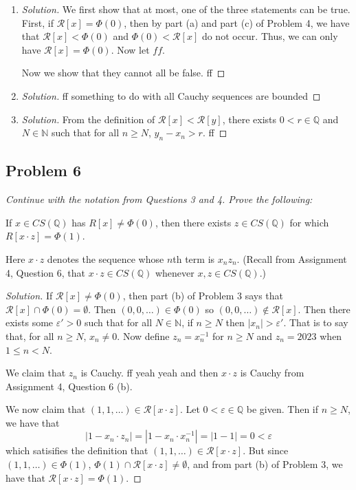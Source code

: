 \documentclass{article}
\newcommand{\N}{{\mathbb N}}
\newcommand{\Q}{{\mathbb Q}}
\newcommand{\ep}{{\varepsilon}}
\newcommand{\SR}{{\mathcal R}}
\begin{document}
\begin{enumerate}
	\item \begin{proof}[Solution]\let\qed\relax
		We first show that at most,
		one of the three statements can be true.
		First, if $\SR[x] = \Phi(0)$,
		then by part (a) and part (c) of Problem 4,
		we have that $\SR[x] < \Phi(0)$ and $\Phi(0) < \SR[x]$
		do not occur.
		Thus, we can only have $\SR[x] = \Phi(0)$.
		Now let $ff$.

		Now we show that they cannot all be false. ff
	\end{proof}
	\item \begin{proof}[Solution]\let\qed\relax
		ff something to do with all Cauchy sequences are bounded
	\end{proof}
	\item \begin{proof}[Solution]\let\qed\relax
		From the definition of $\SR[x] < \SR[y]$,
		there exists $0 < r \in \Q$ and $N \in \N$
		such that for all $n \geq N$,
		$y_n - x_n > r$.
		ff
	\end{proof} 
\end{enumerate}
\clearpage

\subsection*{Problem 6}
{\it Continue with the notation from Questions 3 and 4. Prove the following:
\begin{center}
	If $x \in CS(\Q)$ has $R[x] \neq \Phi(0)$,
	then there exists $z \in CS(\Q)$ for which $R[x\cdot z] = \Phi(1)$.
\end{center}
Here $x \cdot z$ denotes the sequence whose $n$th term is $x_nz_n$.
(Recall from Assignment 4, Question 6,
that $x\cdot z \in CS(\Q)$ whenever $x,z \in CS(\Q)$.)}

\begin{proof}[Solution]\let\qed\relax
	If $\SR[x] \neq \Phi(0)$,
	then part (b) of Problem 3 says that $\SR[x] \cap \Phi(0) = \emptyset$.
	Then $(0,0,\dots) \in \Phi(0)$ so $(0,0,\dots) \not\in \SR[x]$.
	Then there exists some $\ep' > 0$ such that for all
	$N \in \N$, if $n \geq N$ then $|x_n| > \ep'$.
	That is to say that, for all $n\geq N$, $x_n \neq 0$.
	Now define $z_n = x_n^{-1}$ for $n \geq N$ and $z_n = 2023$
	when $1 \leq n < N$.

	We claim that $z_n$ is Cauchy. ff
	yeah yeah and then $x \cdot z$ is Cauchy from Assignment 4, Question 6 (b).

	We now claim that $(1,1,\dots) \in \SR[x\cdot z]$.
	Let $0 < \ep \in \Q$ be given.
	Then if $n \geq N$,
	we have that
	\[
		|1 - x_n\cdot z_n| = |1 - x_n\cdot x_n^{-1}| = |1-1| = 0 < \ep
	\]
	which satisifies the definition that $(1,1,\dots) \in \SR[x\cdot z]$.
	But since $(1,1,\dots) \in \Phi(1)$,
	$\Phi(1) \cap \SR[x \cdot z] \neq \emptyset$,
	and from part (b) of Problem 3, we have that $\SR[x\cdot z] = \Phi(1)$.
\end{proof}
\clearpage
~\clearpage
\end{document}
